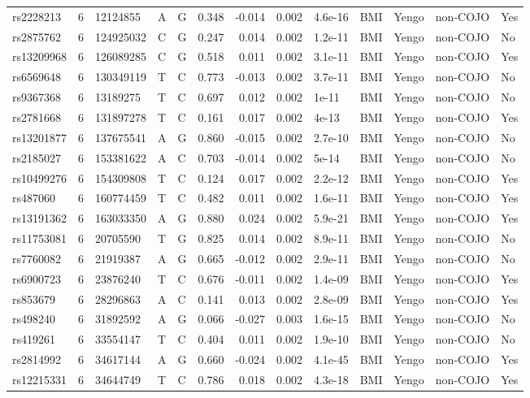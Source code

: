 \documentclass[11pt,twoside]{bristolthesis}
\begin{document}
\begin{longtable}[t]{lrlllrrrlllll}
\addlinespace
rs2228213 & 6 & 12124855 & A & G & 0.348 & -0.014 & 0.002 & 4.6e-16 & BMI & Yengo & non-COJO & Yes\\
rs2875762 & 6 & 124925032 & C & G & 0.247 & 0.014 & 0.002 & 1.2e-11 & BMI & Yengo & non-COJO & No\\
rs13209968 & 6 & 126089285 & C & G & 0.518 & 0.011 & 0.002 & 3.1e-11 & BMI & Yengo & non-COJO & Yes\\
rs6569648 & 6 & 130349119 & T & C & 0.773 & -0.013 & 0.002 & 3.7e-11 & BMI & Yengo & non-COJO & No\\
rs9367368 & 6 & 13189275 & T & C & 0.697 & 0.012 & 0.002 & 1e-11 & BMI & Yengo & non-COJO & No\\
\addlinespace
rs2781668 & 6 & 131897278 & T & C & 0.161 & 0.017 & 0.002 & 4e-13 & BMI & Yengo & non-COJO & Yes\\
rs13201877 & 6 & 137675541 & A & G & 0.860 & -0.015 & 0.002 & 2.7e-10 & BMI & Yengo & non-COJO & No\\
rs2185027 & 6 & 153381622 & A & C & 0.703 & -0.014 & 0.002 & 5e-14 & BMI & Yengo & non-COJO & No\\
rs10499276 & 6 & 154309808 & T & C & 0.124 & 0.017 & 0.002 & 2.2e-12 & BMI & Yengo & non-COJO & Yes\\
rs487060 & 6 & 160774459 & T & C & 0.482 & 0.011 & 0.002 & 1.6e-11 & BMI & Yengo & non-COJO & Yes\\
\addlinespace
rs13191362 & 6 & 163033350 & A & G & 0.880 & 0.024 & 0.002 & 5.9e-21 & BMI & Yengo & non-COJO & Yes\\
rs11753081 & 6 & 20705590 & T & G & 0.825 & 0.014 & 0.002 & 8.9e-11 & BMI & Yengo & non-COJO & No\\
rs7760082 & 6 & 21919387 & A & G & 0.665 & -0.012 & 0.002 & 2.9e-11 & BMI & Yengo & non-COJO & No\\
rs6900723 & 6 & 23876240 & T & C & 0.676 & -0.011 & 0.002 & 1.4e-09 & BMI & Yengo & non-COJO & Yes\\
rs853679 & 6 & 28296863 & A & C & 0.141 & 0.013 & 0.002 & 2.8e-09 & BMI & Yengo & non-COJO & Yes\\
\addlinespace
rs498240 & 6 & 31892592 & A & G & 0.066 & -0.027 & 0.003 & 1.6e-15 & BMI & Yengo & non-COJO & No\\
rs419261 & 6 & 33554147 & T & C & 0.404 & 0.011 & 0.002 & 1.9e-10 & BMI & Yengo & non-COJO & No\\
rs2814992 & 6 & 34617144 & A & G & 0.660 & -0.024 & 0.002 & 4.1e-45 & BMI & Yengo & non-COJO & Yes\\
rs12215331 & 6 & 34644749 & T & C & 0.786 & 0.018 & 0.002 & 4.3e-18 & BMI & Yengo & non-COJO & Yes\\

\end{longtable}
\end{document}
